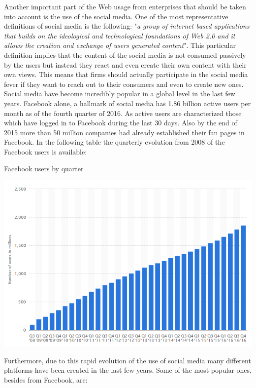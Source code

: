 \documentclass{article}
\begin{document}
Another important part of the Web usage from enterprises that should be taken into account is the use of the social media. One of the most representative definitions\cite{key27} of social media is the following: "\textit{a group of internet based applications that builds on the ideological and technological foundations of Web 2.0 and it allows the creation and exchange of users generated content}". This particular definition implies that the content of the social media is not consumed passively by the users but instead they react and even create their own content with their own views. This means that firms should actually participate in the social media fever if they want to reach out to their consumers and even to create new ones. Social media have become incredibly popular in a global level in the last few years. Facebook alone, a hallmark of social media has 1.86 billion active users per month as of the fourth quarter of 2016.\cite{key21} As active users are characterized those which have logged in to Facebook during the last 30 days. Also by the end of 2015 more than 50 million companies had already established their fan pages in Facebook.\cite{key26} In the following table the quarterly evolution from 2008 of the Facebook users is available:
\begin{table}[H]
\centering
\caption{Facebook users by quarter}
\begin{center}
\includegraphics[scale=0.5]{../R/photos/facebook_q_users.png}   
\end{center}
\end{table}
Furthermore, due to this rapid evolution of the use of social media many different platforms have been created in the last few years. Some of the most popular ones, besides from Facebook, are:
\end{document}
